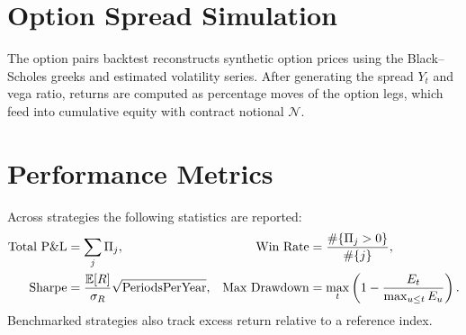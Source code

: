 \section{Option Spread Simulation}
The option pairs backtest reconstructs synthetic option prices using the Black--Scholes greeks and estimated volatility series. After generating the spread $Y_t$ and vega ratio, returns are computed as percentage moves of the option legs, which feed into cumulative equity with contract notional $\mathcal{N}$.

\section{Performance Metrics}
Across strategies the following statistics are reported:
\begin{align}
\text{Total P\&L} &= \sum_j \Pi_j, & \text{Win Rate} &= \frac{\#\{\Pi_j > 0\}}{\#\{j\}},\\
\text{Sharpe} &= \frac{\mathbb{E}[R]}{\sigma_R} \sqrt{\text{PeriodsPerYear}}, & \text{Max Drawdown} &= \max_t \left(1 - \frac{E_t}{\max_{u \leq t} E_u}\right).
\end{align}
Benchmarked strategies also track excess return relative to a reference index.
